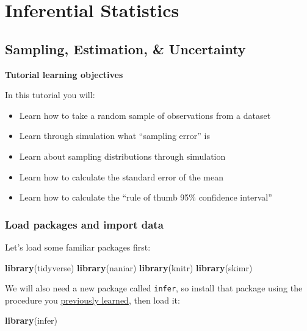 \documentclass[
]{book}
\newenvironment{Shaded}{\begin{snugshade}}{\end{snugshade}}
\newcommand{\FunctionTok}[1]{\textcolor[rgb]{0.13,0.29,0.53}{\textbf{#1}}}
\newcommand{\NormalTok}[1]{#1}
\providecommand{\tightlist}{%
  \setlength{\itemsep}{0pt}\setlength{\parskip}{0pt}}
\begin{document}
\part*{Inferential Statistics}\label{part-inferential-statistics}

\chapter{Sampling, Estimation, \& Uncertainty}\label{estimation}

\textbf{Tutorial learning objectives}

In this tutorial you will:

\begin{itemize}
\tightlist
\item
  Learn how to take a random sample of observations from a dataset
\item
  Learn through simulation what ``sampling error'' is
\item
  Learn about sampling distributions through simulation
\item
  Learn how to calculate the standard error of the mean
\item
  Learn how to calculate the ``rule of thumb 95\% confidence interval''
\end{itemize}

\section{Load packages and import data}\label{estimation_packages_data}

Let's load some familiar packages first:

\begin{Shaded}
\begin{Highlighting}[]
\FunctionTok{library}\NormalTok{(tidyverse)}
\FunctionTok{library}\NormalTok{(naniar)}
\FunctionTok{library}\NormalTok{(knitr)}
\FunctionTok{library}\NormalTok{(skimr)}
\end{Highlighting}
\end{Shaded}

We will also need a new package called \texttt{infer}, so install that package using the procedure you \hyperref[package_install]{previously learned}, then load it:

\begin{Shaded}
\begin{Highlighting}[]
\FunctionTok{library}\NormalTok{(infer)}
\end{Highlighting}
\end{Shaded}
\end{document}
